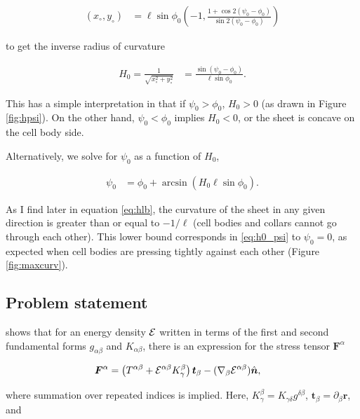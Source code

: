 \begin{align*}
    (x_\circ, y_\circ) &= \ell \sin\phi_0\left(-1, \frac{1+\cos2(\psi_0 - \phi_0)}{\sin2(\psi_0 - \phi_0)} \right)
\end{align*}

\noindent to get the inverse radius of curvature 

\begin{align}
    H_0 = \frac{1}{\sqrt{x_\circ^2 + y_\circ^2}} &= \frac{\sin(\psi_0 - \phi_0)}{\ell \sin\phi_0}. \label{eq:h0}
\end{align}

This has a simple interpretation in that if $\psi_0 > \phi_0$, $H_0 > 0$ (as drawn in Figure \ref{fig:hpsi}). On the other hand, $\psi_0 < \phi_0$ implies $H_0 < 0$, or the sheet is concave on the cell body side. 

Alternatively, we solve for $\psi_0$ as a function of $H_0$,

\begin{align}
    \psi_0 &= \phi_0 + \arcsin \left( H_0 \ell \sin \phi_0 \right). \label{eq:h0_psi}
\end{align}

As I find later in equation \ref{eq:hlb}, the curvature of the sheet in any given direction is greater than or equal to $-1/\ell$ (cell bodies and collars cannot go through each other). 
This lower bound corresponds in \ref{eq:h0_psi} to $\psi_0 = 0$, as expected when cell bodies are pressing tightly against each other (Figure \ref{fig:maxcurv}).

\subsection{Problem statement} \label{subsec:problem}

\citet{powers2010} shows that for an energy density $\mathcal{E}$ written in terms of the first and second fundamental forms $g_{\alpha\beta}$ and $K_{\alpha\beta}$, there is an expression for the stress tensor $\bm{F}^\alpha$ 

\begin{align}
    \bm{F}^\alpha &= \left(T^{\alpha\beta} + \mathcal{E}^{\alpha\beta}K_\gamma^\beta \right)\bm{t}_\beta - (\nabla_\beta \mathcal{E}^{\alpha\beta})\hat{\bm{n}}, \label{eq:stress}
\end{align}

\noindent where summation over repeated indices is implied. Here, $K_\gamma^\beta = K_{\gamma \delta}g^{\delta \beta}$, $\bm{t}_\beta = \partial_\beta \bm{r}$, and 

